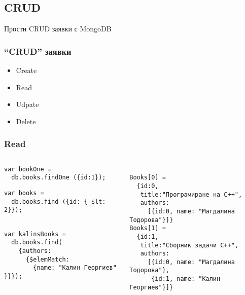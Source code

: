 \documentclass{beamer}
\begin{document}
\subsection{CRUD}

\begin{frame}
\centerline{Прости CRUD заявки с MongoDB}
\end{frame}



\begin{frame}[fragile]
\frametitle{``CRUD'' заявки}


\begin{itemize}
  \item Create
  \item Read
  \item Udpate
  \item Delete
\end{itemize}

\end{frame}


\begin{frame}[fragile]
\frametitle{Read}

\lstset{language=JavaScript}


\begin{columns}
  \begin{column}{0.55\textwidth}

\begin{lstlisting}
var bookOne =
  db.books.findOne ({id:1});
\end{lstlisting}


\begin{lstlisting}
var books =
  db.books.find ({id: { $lt: 2}});
\end{lstlisting}


\begin{lstlisting}

var kalinsBooks =
  db.books.find(
    {authors:
      {$elemMatch:
        {name: "Калин Георгиев" }}});
\end{lstlisting}

  \end{column}
  \begin{column}{0.45\textwidth}
\begin{lstlisting}

Books[0] =
  {id:0,
   title:"Програмиране на C++",
   authors:
     [{id:0, name: "Магдалина Тодорова"}]}
Books[1] =
  {id:1,
   title:"Сборник задачи C++",
   authors:
     [{id:0, name: "Магдалина Тодорова"},
      {id:1, name: "Калин Георгиев"}]}
\end{lstlisting}
  \end{column}
\end{columns}


\end{frame}
\end{document}
